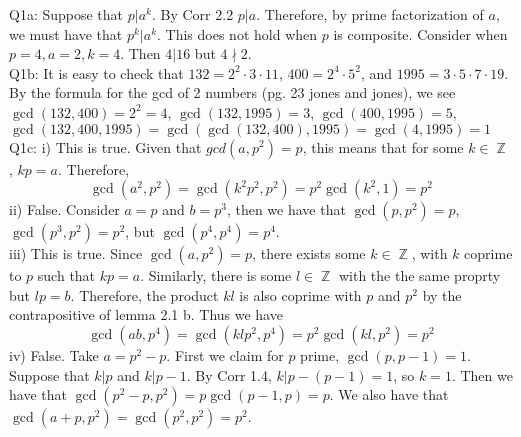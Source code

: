 \documentclass[letterpaper]{article}
\DeclareMathOperator{\Z}{\mathbb{Z}}
\begin{document}
\noindent Q1a: Suppose that $p|a^k$. By Corr 2.2 $p|a$. Therefore, by prime factorization of $a$, we must have that $p^k|a^k$. 
This does not hold when $p$ is composite. Consider when $p=4,a=2,k=4$. Then $4|16$ but $4\nmid 2$. 
\newline \\ Q1b: It is easy to check that $132 = 2^2 \cdot 3\cdot 11$, $400 = 2^4 \cdot 5^2$,  and $1995 = 3\cdot 5\cdot 7 \cdot 19$. By the formula for the gcd of 2 numbers (pg. 23 jones and jones), we see $\gcd(132,400) = 2^2 = 4$, $\gcd(132,1995) = 3$, $\gcd(400,1995) = 5$,$\gcd(132,400,1995) = \gcd(\gcd(132,400),1995) = \gcd(4,1995) = 1$
\newline \\ Q1c: i) This is true. Given that $gcd(a,p^2) = p$, this means that for some $k\in \Z$, $kp=a$. Therefore, $$\gcd(a^2,p^2)=\gcd(k^2p^2,p^2) = p^2\gcd(k^2,1) = p^2$$
\newline ii) False. Consider $a=p$ and $b=p^3$, then we have that $\gcd(p,p^2) = p$, $\gcd(p^3,p^2)=p^2$, but $\gcd(p^4,p^4)=p^4$. 
\newline \\ iii) This is true. Since $\gcd(a,p^2)=p$, there exists some $k\in \Z $, with $k$ coprime to $p$ such that $kp=a$. Similarly, there is some $l \in \Z$ with the the same proprty but $lp = b$. Therefore, the product $kl$ is also coprime with $p$ and $p^2$ by the contrapositive of lemma 2.1 b. Thus we have $$\gcd(ab,p^4) = \gcd(klp^2,p^4) = p^2\gcd(kl,p^2) = p^2$$
\newline iv) False. Take $a=p^2-p$. First we claim for $p$ prime, $\gcd(p,p-1)=1$. Suppose that $k|p$ and $k|p-1$. By Corr 1.4, $k|p-(p-1)=1$, so $k=1$. Then we have that $\gcd(p^2-p,p^2) =p \gcd(p-1,p)=p$. We also have that $\gcd(a+p,p^2) = \gcd(p^2,p^2)=p^2$. 
\end{document}
